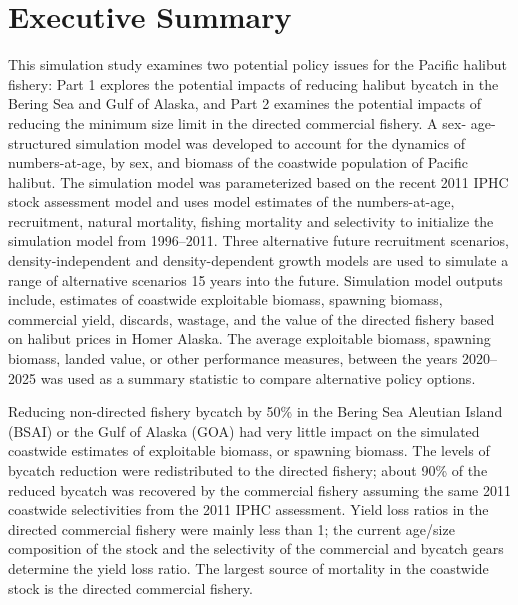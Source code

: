 \section*{Executive Summary} %
\label{sec:executive_summary}

This simulation study examines two potential policy issues for the Pacific halibut fishery: Part 1 explores the potential impacts of reducing halibut bycatch in the Bering Sea and Gulf of Alaska, and Part 2 examines the potential impacts of reducing the minimum size limit  in the directed commercial fishery.  A sex- age-structured  simulation model was developed to account for the dynamics of numbers-at-age, by sex, and biomass of the coastwide population of Pacific halibut.  The simulation model was parameterized based on the recent 2011 IPHC stock assessment model and uses model estimates of the numbers-at-age, recruitment, natural mortality, fishing mortality and selectivity to initialize the simulation model from 1996--2011. Three alternative future recruitment scenarios, density-independent and density-dependent growth models are used to simulate a range of alternative scenarios 15 years into the future.  Simulation model outputs include, estimates of coastwide exploitable biomass, spawning biomass, commercial yield, discards, wastage, and the value of the directed fishery based on halibut prices in Homer Alaska.  The average exploitable biomass, spawning biomass, landed value, or other performance measures, between the years 2020--2025 was used as a summary statistic to compare alternative policy options.

Reducing non-directed fishery bycatch by 50\% in the Bering Sea Aleutian Island (BSAI) or the Gulf of Alaska (GOA) had very little impact on the simulated coastwide estimates of exploitable biomass, or spawning biomass.   The levels of bycatch reduction were redistributed to the directed fishery; about 90\% of the reduced bycatch was recovered by the commercial fishery assuming the same 2011 coastwide selectivities from the 2011 IPHC assessment.  Yield loss ratios in the directed commercial fishery were mainly less than 1; the current age/size composition of the stock and the selectivity of the commercial and bycatch gears determine the yield loss ratio.  The largest source of mortality in the coastwide stock is the directed commercial fishery.


